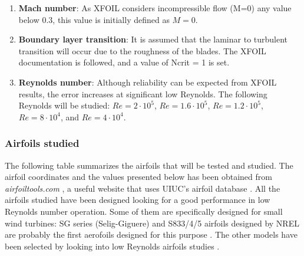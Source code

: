 \documentclass[../TFG_Report.tex]{subfiles}
\begin{document}
\begin{enumerate}
	\item \textbf{Mach number}: As XFOIL considers incompressible flow (M=0) any value below 0.3, this value is initially defined as $M=0$.
	
	\item \textbf{Boundary layer transition}: It is assumed that the laminar to turbulent transition will occur due to the roughness of the blades. The XFOIL documentation is followed, and a value of Ncrit = 1 is set. \cite{XFOIL} 
		 
	\item \textbf{Reynolds number}: Although reliability can be expected from XFOIL results, the error increases at significant low Reynolds. The following Reynolds will be studied: $Re=2\cdot10^5$, $Re=1.6\cdot10^5$, $Re=1.2\cdot10^5$, $Re=8\cdot10^4$, and $Re=4\cdot10^4$.
\end{enumerate}




\subsubsection{Airfoils studied}

The following table summarizes the airfoils that will be tested and studied. The airfoil coordinates and the values presented below has been obtained from \textit{airfoiltools.com} \cite{Airfoiltools}, a useful website that uses UIUC's airfoil database \cite{UIUC}. All the airfoils studied have been designed looking for a good performance in low Reynolds number operation. Some of them are specifically designed for small wind turbines: SG series (Selig-Giguere) and S833/4/5 airfoils designed by NREL are probably the first aerofoils designed for this purpose \cite{Wood}. The other models have been selected by looking into low Reynolds airfoils studies \cite{fuentes2016airfoil} \cite{shah2012low}.  
\end{document}
